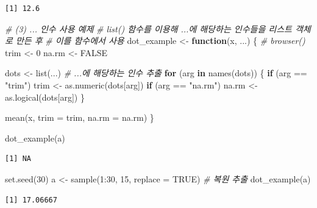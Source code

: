 \documentclass[
  11pt,
]{krantz}
\newenvironment{Shaded}{\begin{snugshade}}{\end{snugshade}}
\newcommand{\AttributeTok}[1]{\textcolor[rgb]{0.61,0.61,0.61}{#1}}
\newcommand{\CommentTok}[1]{\textcolor[rgb]{0.37,0.37,0.37}{\textit{#1}}}
\newcommand{\ConstantTok}[1]{\textcolor[rgb]{0,0,0}{#1}}
\newcommand{\ControlFlowTok}[1]{\textcolor[rgb]{0.27,0.27,0.27}{\textbf{#1}}}
\newcommand{\DecValTok}[1]{\textcolor[rgb]{0.06,0.06,0.06}{#1}}
\newcommand{\FunctionTok}[1]{\textcolor[rgb]{0,0,0}{#1}}
\newcommand{\NormalTok}[1]{#1}
\newcommand{\OtherTok}[1]{\textcolor[rgb]{0.37,0.37,0.37}{#1}}
\newcommand{\SpecialCharTok}[1]{\textcolor[rgb]{0,0,0}{#1}}
\newcommand{\StringTok}[1]{\textcolor[rgb]{0.5,0.5,0.5}{#1}}
\begin{document}
\begin{verbatim}
[1] 12.6
\end{verbatim}

\begin{Shaded}
\begin{Highlighting}[]
\CommentTok{\# (3) ... 인수 사용 예제}
\CommentTok{\# list() 함수를 이용해 \textasciigrave{}...\textasciigrave{}에 해당하는 인수들을 리스트 객체로 만든 후 }
\CommentTok{\# 이를 함수에서 사용}
\NormalTok{dot\_example }\OtherTok{\textless{}{-}} \ControlFlowTok{function}\NormalTok{(x, ...) \{}
  \CommentTok{\# browser()}
\NormalTok{  trim }\OtherTok{\textless{}{-}} \DecValTok{0}
\NormalTok{  na.rm }\OtherTok{\textless{}{-}} \ConstantTok{FALSE}
  
\NormalTok{  dots }\OtherTok{\textless{}{-}} \FunctionTok{list}\NormalTok{(...) }\CommentTok{\# ...에 해당하는 인수 추출}
  \ControlFlowTok{for}\NormalTok{ (arg }\ControlFlowTok{in} \FunctionTok{names}\NormalTok{(dots)) \{}
    \ControlFlowTok{if}\NormalTok{ (arg }\SpecialCharTok{==} \StringTok{"trim"}\NormalTok{) trim }\OtherTok{\textless{}{-}} \FunctionTok{as.numeric}\NormalTok{(dots[arg])}
    \ControlFlowTok{if}\NormalTok{ (arg }\SpecialCharTok{==} \StringTok{"na.rm"}\NormalTok{) na.rm }\OtherTok{\textless{}{-}} \FunctionTok{as.logical}\NormalTok{(dots[arg])}
\NormalTok{  \} }
  
  \FunctionTok{mean}\NormalTok{(x, }\AttributeTok{trim =}\NormalTok{ trim, }\AttributeTok{na.rm =}\NormalTok{ na.rm)}
\NormalTok{\}}

\FunctionTok{dot\_example}\NormalTok{(a)}
\end{Highlighting}
\end{Shaded}

\begin{verbatim}
[1] NA
\end{verbatim}

\begin{Shaded}
\begin{Highlighting}[]
\FunctionTok{set.seed}\NormalTok{(}\DecValTok{30}\NormalTok{)}
\NormalTok{a }\OtherTok{\textless{}{-}} \FunctionTok{sample}\NormalTok{(}\DecValTok{1}\SpecialCharTok{:}\DecValTok{30}\NormalTok{, }\DecValTok{15}\NormalTok{, }\AttributeTok{replace =} \ConstantTok{TRUE}\NormalTok{) }\CommentTok{\# 복원 추출}
\FunctionTok{dot\_example}\NormalTok{(a)}
\end{Highlighting}
\end{Shaded}

\begin{verbatim}
[1] 17.06667
\end{verbatim}
\end{document}
